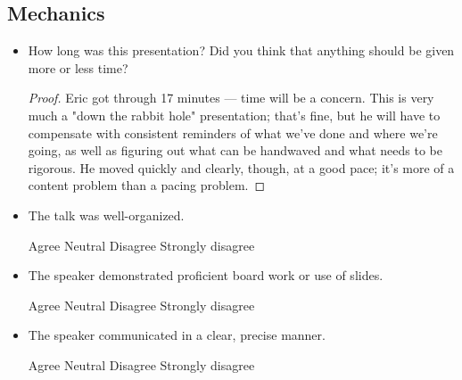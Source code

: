 \documentclass[../finalProject.tex]{subfiles}
\begin{document}
\subsection*{Mechanics}
\begin{itemize}
    \item How long was this presentation? Did you think that anything should be given more or less time?
    \begin{proof}
        Eric got through 17 minutes --- time will be a concern. This is very much a "down the rabbit hole" presentation; that's fine, but he will have to compensate with consistent reminders of what we've done and where we're going, as well as figuring out what can be handwaved and what needs to be rigorous. He moved quickly and clearly, though, at a good pace; it's more of a content problem than a pacing problem.
    \end{proof}
    \item The talk was well-organized.
    \begin{center}
         \hspace{1em} Agree \hspace{1em} Neutral \hspace{1em} Disagree \hspace{1em} Strongly disagree
    \end{center}
    \item The speaker demonstrated proficient board work or use of slides.
    \begin{center}
         \hspace{1em} Agree \hspace{1em} Neutral \hspace{1em} Disagree \hspace{1em} Strongly disagree
    \end{center}
    \item The speaker communicated in a clear, precise manner.
    \begin{center}
         \hspace{1em} Agree \hspace{1em} Neutral \hspace{1em} Disagree \hspace{1em} Strongly disagree
    \end{center}
\end{itemize}
\end{document}
